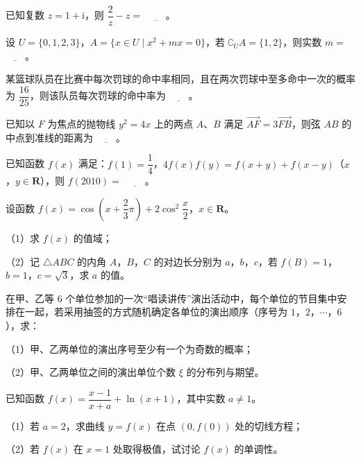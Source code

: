 \begin{question}
已知复数 $z=1+\mathrm{i}$，则 $\dfrac2z-z=$ $\underline{\qquad}$。

\end{question}
\begin{question}
设 $U=\{0,1,2,3\}$，$A=\{x\in U\mid x^2+mx=0\}$，若 $\complement_U A=\{1,2\}$，则实数 $m=$ $\underline{\qquad}$。

\end{question}
\begin{question}
某篮球队员在比赛中每次罚球的命中率相同，且在两次罚球中至多命中一次的概率为 $\dfrac{16}{25}$，则该队员每次罚球的命中率为 $\underline{\qquad}$。

\end{question}
\begin{question}
已知以 $F$ 为焦点的抛物线 $y^2=4x$ 上的两点 $A$、$B$ 满足 $\overrightarrow{AF}=3\overrightarrow{FB}$，则弦 $AB$ 的中点到准线的距离为 $\underline{\qquad}$。

\end{question}
\begin{question}
已知函数 $f(x)$ 满足：$f(1)=\dfrac14$，$4f(x)f(y)=f(x+y)+f(x-y)$（$x$，$y\in\mathbf R$），则 $f(2010)=$ $\underline{\qquad}$。

\end{question}
\begin{question}
设函数 $f(x)=\cos\left(x+\dfrac23\pi\right)+2\cos^2\dfrac x2$，$x\in\mathbf R$。

（1）求 $f(x)$ 的值域；

（2）记 $\triangle ABC$ 的内角 $A$，$B$，$C$ 的对边长分别为 $a$，$b$，$c$，若 $f(B)=1$，$b=1$，$c=\sqrt3$，求 $a$ 的值。

\end{question}
\begin{question}
在甲、乙等 $6$ 个单位参加的一次“唱读讲传”演出活动中，每个单位的节目集中安排在一起，若采用抽签的方式随机确定各单位的演出顺序（序号为 $1$，$2$，$\cdots$，$6$），求：

（1）甲、乙两单位的演出序号至少有一个为奇数的概率；

（2）甲、乙两单位之间的演出单位个数 $\xi$ 的分布列与期望。

\end{question}
\begin{question}
已知函数 $f(x)=\dfrac{x-1}{x+a}+\ln(x+1)$，其中实数 $a\neq1$。

（1）若 $a=2$，求曲线 $y=f(x)$ 在点 $(0,f(0))$ 处的切线方程；

（2）若 $f(x)$ 在 $x=1$ 处取得极值，试讨论 $f(x)$ 的单调性。

\Needspace{0.4\textheight}
\end{question}
